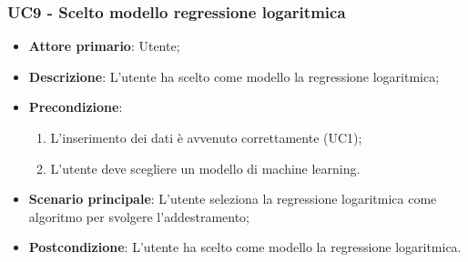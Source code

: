 \subsubsection{UC9 - Scelto modello regressione logaritmica}
\label{sssec:uc9}
\begin{itemize}
  \item \textbf{Attore primario}: Utente;
  \item \textbf{Descrizione}: L'utente ha scelto come modello la regressione logaritmica;
  \item \textbf{Precondizione}:
  \begin{enumerate}
    \item L'inserimento dei dati è avvenuto correttamente (UC1);
    \item L'utente deve scegliere un modello di machine learning.
  \end{enumerate}
  \item \textbf{Scenario principale}: L'utente seleziona la regressione logaritmica come algoritmo per svolgere l'addestramento;
  \item \textbf{Postcondizione}: L'utente ha scelto come modello la regressione logaritmica.
\end{itemize}
